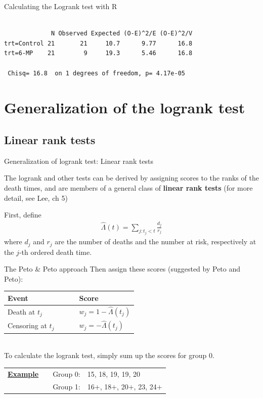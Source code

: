 \documentclass[envcountsect, 10pt, portrait, palatino]{beamer}
\begin{document}
\begin{frame}[fragile]{Calculating the Logrank test with R}
\begin{verbatim}

             N Observed Expected (O-E)^2/E (O-E)^2/V
trt=Control 21       21     10.7      9.77      16.8
trt=6-MP    21        9     19.3      5.46      16.8

 Chisq= 16.8  on 1 degrees of freedom, p= 4.17e-05
\end{verbatim}
\end{frame}

\section{Generalization of the logrank test}
\subsection{Linear rank tests}

\begin{frame}{Generalization of logrank test: Linear rank tests}

The logrank and other tests can be derived by assigning scores to the
ranks of the death times, and are members of a general class
of {\bf linear rank tests} (for more detail, see Lee, ch 5)

First, define
\begin{eqnarray*}
\hat\Lambda(t) = \sum_{j: t_j <t} \frac{d_j}{r_j}
\end{eqnarray*}
where $d_j$ and $r_j$ are the number of deaths and the
number at risk, respectively at the $j$-th ordered death
time.
\end{frame}

\begin{frame}{The Peto \& Peto approach}
Then assign these scores (suggested by Peto and Peto):
\begin{center}
\begin{tabular}{ll}
\hline \hline
{\sc Event} & {\sc Score} \\ \hline
Death at $t_j$ & $w_j=1 - \hat\Lambda(t_j)$\\[1ex]
Censoring at $t_j$~~~~~ & $w_j= - \hat\Lambda(t_j)$\\
\hline
\end{tabular}
\end{center}
~\\[2ex]
To calculate the logrank test, simply sum up the scores for group 0.
\begin{tabular}{lll}
\underline{\bf Example}~~ & Group 0: & 15, 18, 19, 19, 20 \\[1ex]
                          & Group 1: & 16$+$, 18$+$, 20$+$, 23, 24$+$
\end{tabular}

\end{frame}
\end{document}
